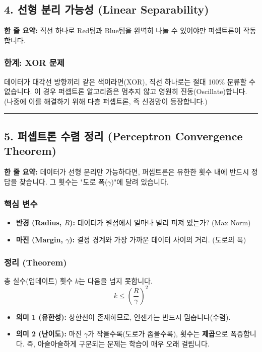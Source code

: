 \documentclass[11pt,a4paper]{book}
\theoremstyle{definition}
\begin{document}
\subsection{4. 선형 분리 가능성 (Linear Separability)}

\begin{conceptbox}[title={개념 4: 자 하나로 가를 수 있는가?}]
\textbf{한 줄 요약:} 직선 하나로 Red팀과 Blue팀을 완벽히 나눌 수 있어야만 퍼셉트론이 작동합니다.
\end{conceptbox}


\subsubsection*{한계: XOR 문제}
데이터가 대각선 방향끼리 같은 색이라면(XOR), 직선 하나로는 절대 100\% 분류할 수 없습니다.
이 경우 퍼셉트론 알고리즘은 멈추지 않고 영원히 진동(Oscillate)합니다. (나중에 이를 해결하기 위해 다층 퍼셉트론, 즉 신경망이 등장합니다.)

\vspace{0.5cm}\hrule\vspace{0.5cm}

\subsection{5. 퍼셉트론 수렴 정리 (Perceptron Convergence Theorem)}

\begin{conceptbox}[title={개념 5: 언제 끝나는가?}]
\textbf{한 줄 요약:} 데이터가 선형 분리만 가능하다면, 퍼셉트론은 유한한 횟수 내에 반드시 정답을 찾습니다. 그 횟수는 "도로 폭($\gamma$)"에 달려 있습니다.
\end{conceptbox}


\subsubsection*{핵심 변수}
\begin{itemize}
    \item \textbf{반경 (Radius, $R$):} 데이터가 원점에서 얼마나 멀리 퍼져 있는가? (Max Norm)
    \item \textbf{마진 (Margin, $\gamma$):} 결정 경계와 가장 가까운 데이터 사이의 거리. (도로의 폭)
\end{itemize}

\subsubsection*{정리 (Theorem)}
총 실수(업데이트) 횟수 $k$는 다음을 넘지 못합니다.
$$ k \le \left( \frac{R}{\gamma} \right)^2 $$
\begin{itemize}
    \item \textbf{의미 1 (유한성):} 상한선이 존재하므로, 언젠가는 반드시 멈춥니다(수렴).
    \item \textbf{의미 2 (난이도):} 마진 $\gamma$가 작을수록(도로가 좁을수록), 횟수는 \textbf{제곱}으로 폭증합니다. 즉, 아슬아슬하게 구분되는 문제는 학습이 매우 오래 걸립니다.
\end{itemize}
\end{document}
